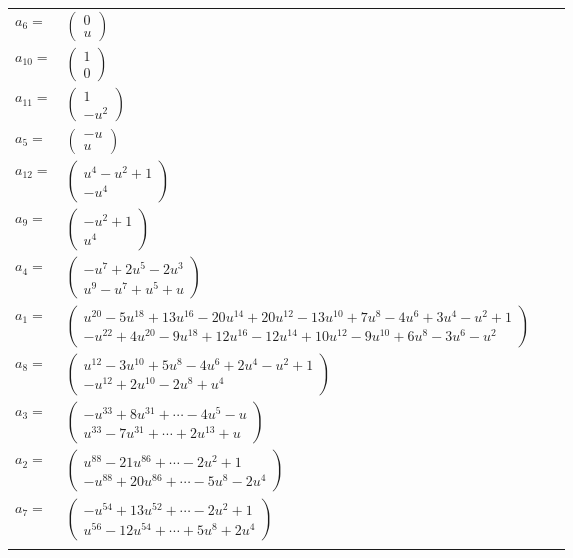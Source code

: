 \documentclass[1p]{elsarticle_modified}
\theoremstyle{definition}
\begin{document}
\begin{tabular}{m{7pt} m{180pt} m{7pt} m{180pt} }
\flushright $a_{6}=$&$\begin{pmatrix}0\\u\end{pmatrix}$ \\
\flushright $a_{10}=$&$\begin{pmatrix}1\\0\end{pmatrix}$ \\
\flushright $a_{11}=$&$\begin{pmatrix}1\\- u^2\end{pmatrix}$ \\
\flushright $a_{5}=$&$\begin{pmatrix}- u\\u\end{pmatrix}$ \\
\flushright $a_{12}=$&$\begin{pmatrix}u^4- u^2+1\\- u^4\end{pmatrix}$ \\
\flushright $a_{9}=$&$\begin{pmatrix}- u^2+1\\u^4\end{pmatrix}$ \\
\flushright $a_{4}=$&$\begin{pmatrix}- u^7+2 u^5-2 u^3\\u^9- u^7+u^5+u\end{pmatrix}$ \\
\flushright $a_{1}=$&$\begin{pmatrix}u^{20}-5 u^{18}+13 u^{16}-20 u^{14}+20 u^{12}-13 u^{10}+7 u^8-4 u^6+3 u^4- u^2+1\\- u^{22}+4 u^{20}-9 u^{18}+12 u^{16}-12 u^{14}+10 u^{12}-9 u^{10}+6 u^8-3 u^6- u^2\end{pmatrix}$ \\
\flushright $a_{8}=$&$\begin{pmatrix}u^{12}-3 u^{10}+5 u^8-4 u^6+2 u^4- u^2+1\\- u^{12}+2 u^{10}-2 u^8+u^4\end{pmatrix}$ \\
\flushright $a_{3}=$&$\begin{pmatrix}- u^{33}+8 u^{31}+\cdots-4 u^5- u\\u^{33}-7 u^{31}+\cdots+2 u^{13}+u\end{pmatrix}$ \\
\flushright $a_{2}=$&$\begin{pmatrix}u^{88}-21 u^{86}+\cdots-2 u^2+1\\- u^{88}+20 u^{86}+\cdots-5 u^8-2 u^4\end{pmatrix}$ \\
\flushright $a_{7}=$&$\begin{pmatrix}- u^{54}+13 u^{52}+\cdots-2 u^2+1\\u^{56}-12 u^{54}+\cdots+5 u^8+2 u^4\end{pmatrix}$\\&\end{tabular}
\end{document}
